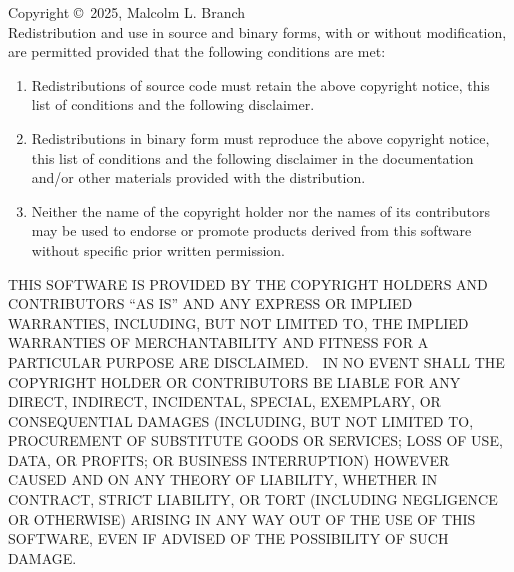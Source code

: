 Copyright \copyright\ 2025, Malcolm L. Branch \\

Redistribution and use in source and binary forms, with or without modification, are permitted provided that the following conditions are met:\ \ 

\begin{enumerate}
\item Redistributions of source code must retain the above copyright notice, this list of conditions and the following disclaimer.\ \ 
\item Redistributions in binary form must reproduce the above copyright notice, this list of conditions and the following disclaimer in the documentation and/or other materials provided with the distribution.\ \ 
\item Neither the name of the copyright holder nor the names of its contributors may be used to endorse or promote products derived from this software without specific prior written permission.\ \ 
\end{enumerate}

THIS SOFTWARE IS PROVIDED BY THE COPYRIGHT HOLDERS AND CONTRIBUTORS ``AS IS'' AND ANY EXPRESS OR IMPLIED WARRANTIES, INCLUDING, BUT NOT LIMITED TO, THE IMPLIED WARRANTIES OF MERCHANTABILITY AND FITNESS FOR A PARTICULAR PURPOSE ARE DISCLAIMED.\ \ IN NO EVENT SHALL THE COPYRIGHT HOLDER OR CONTRIBUTORS BE LIABLE FOR ANY DIRECT, INDIRECT, INCIDENTAL, SPECIAL, EXEMPLARY, OR CONSEQUENTIAL DAMAGES (INCLUDING, BUT NOT LIMITED TO, PROCUREMENT OF SUBSTITUTE GOODS OR SERVICES; LOSS OF USE, DATA, OR PROFITS; OR BUSINESS INTERRUPTION) HOWEVER CAUSED AND ON ANY THEORY OF LIABILITY, WHETHER IN CONTRACT, STRICT LIABILITY, OR TORT (INCLUDING NEGLIGENCE OR OTHERWISE) ARISING IN ANY WAY OUT OF THE USE OF THIS SOFTWARE, EVEN IF ADVISED OF THE POSSIBILITY OF SUCH DAMAGE.\ \ \\

